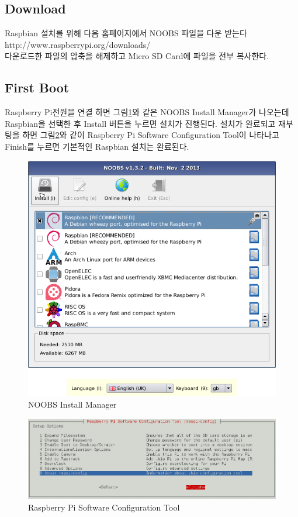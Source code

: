 \documentclass[11pt
  , a4paper
  , article
  , oneside
]{memoir}
\begin{document}
\subsection{Download}
Raspbian 설치를 위해 다음 홈페이지에서 NOOBS 파일을 다운 받는다\\
http://www.raspberrypi.org/downloads/\\
다운로드한 파일의 압축을 해제하고 Micro SD Card에 파일을 전부 복사한다.\\
\subsection{First Boot}
Raspberry Pi전원을 연결 하면 그림\ref{fig:noobs_manager}와 같은 NOOBS Install Manager가 나오는데 
Raspbian을 선택한 후 Install 버튼을 
누르면 설치가 진행된다. 설치가 완료되고 재부팅을 하면 그림\ref{fig:raspi_conf}와 같이 
Raspberry Pi Software Configuration Tool이 나타나고 Finish를 누르면 기본적인 Raspbian 설치는 완료된다.
\begin{figure}[!htb]
\centering
\includegraphics[width=1\textwidth]{./images/raspberry/noobs.png}
\caption{NOOBS Install Manager}
\label{fig:noobs_manager}
\end{figure}

\begin{figure}[!htb]
\centering
\includegraphics[width=1\textwidth]{./images/raspberry/rasp_config.png}
\caption{Raspberry Pi Software Configuration Tool}
\label{fig:raspi_conf}
\end{figure}
\end{document}
